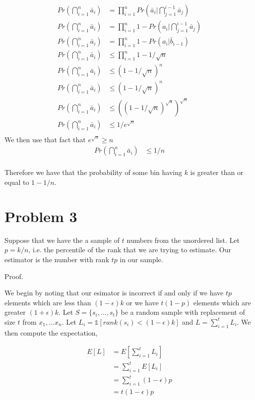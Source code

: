 \documentclass[a4paper]{article}
\newcommand{\ind}[1]{\mathds{1}[#1]}
\def \eps{\epsilon}
\begin{document}
\begin{align*}
	Pr(\bigcap_{i=1}^n \bar a_i ) &= \prod_{i=1}^n Pr(\bar a_i | \bigcap_{j=1}^{i-1} \bar a_j)\\
	Pr(\bigcap_{i=1}^n \bar a_i ) &= \prod_{i=1}^n 1 - Pr(a_i | \bigcap_{j=1}^{i-1} \bar a_j)\\
	Pr(\bigcap_{i=1}^n \bar a_i ) &= \prod_{i=1}^n 1 - Pr(a_i | \bar b_{i-1})\\
	Pr(\bigcap_{i=1}^n \bar a_i ) &\leq \prod_{i=1}^n 1 - 1/\sqrt{n}\\
	Pr(\bigcap_{i=1}^n \bar a_i ) &\leq (1 - 1/\sqrt{n})^n\\
	Pr(\bigcap_{i=1}^n \bar a_i ) &\leq (1 - 1/\sqrt{n})^n\\
	Pr(\bigcap_{i=1}^n \bar a_i ) &\leq ((1 - 1/\sqrt{n})^{\sqrt{n}})^{\sqrt{n}}\\
	Pr(\bigcap_{i=1}^n \bar a_i ) &\leq 1/e^{\sqrt{n}}\\
\end{align*}
We then use that fact that $e^{\sqrt{n}} \geq n$ 
\begin{align*}
	Pr(\bigcap_{i=1}^n \bar a_i ) &\leq 1/n\\
\end{align*}


Therefore we have that the probability of some bin having $k$ is greater than or equal to $1 - 1/n$.






\section{Problem 3}

Suppose that we have the a sample of $t$ numbers from the unordered list. Let $p = k/n$, i.e. the 
percentile of the rank that we are trying to estimate. Our estimator is the number with 
rank $tp$ in our sample.

Proof.

We begin by noting that our esimator is incorrect if and only if we have $tp$ elements which are 
less than $(1-\eps)k$ or we have $t(1-p)$ elements which are greater $(1+\eps)k$. 
Let $S = \{s_i,...,s_t\}$ be a random sample with replacement of size $t$ from $x_1,...x_n$.
Let $L_i = \ind{rank(s_i) < (1-\eps)k}$ and $L = \sum_{i=1}^{t} L_i$. We then compute the expectation,

\begin{align*}
	E[L] &= E[\sum_{i=1}^{t} L_i] \\
			&= \sum_{i=1}^{t} E[L_i]\\
			&= \sum_{i=1}^{t} (1-\eps)p\\
			&=  t(1-\eps)p\\
\end{align*}
\end{document}
